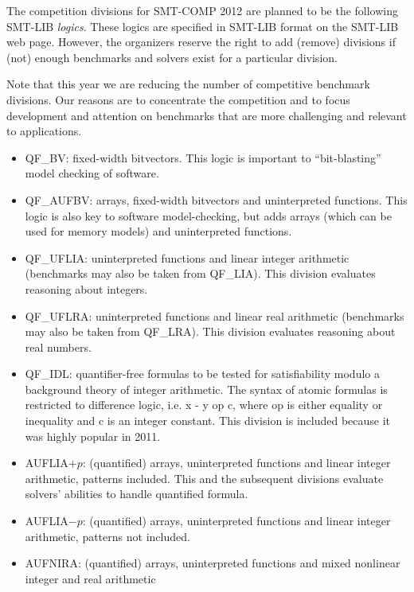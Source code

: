 \documentclass[12pt]{article}
\begin{document}
The competition divisions for SMT-COMP 2012 are planned to be the following
SMT-LIB \emph{logics}.  These logics are specified in SMT-LIB format on the
SMT-LIB web page.  However, the organizers reserve the right to add
(remove) divisions if (not) enough benchmarks and solvers exist for a
particular division.

Note that this year we are reducing the number of competitive benchmark divisions.
Our reasons are to concentrate the competition and to focus development and attention
on benchmarks that are more challenging and relevant to applications.

\begin{itemize}

\item QF\_BV: fixed-width bitvectors. This logic is important to ``bit-blasting'' model checking of software.
\item QF\_AUFBV: arrays, fixed-width bitvectors and uninterpreted
functions. This logic is also key to software model-checking, but adds arrays (which can be used for memory models) and uninterpreted functions.

\item QF\_UFLIA: uninterpreted functions and linear integer arithmetic (benchmarks may also be taken from  QF\_LIA). This division evaluates reasoning about integers.
\item QF\_UFLRA: uninterpreted functions and linear real arithmetic (benchmarks may also be taken from  QF\_LRA). This division evaluates reasoning about real numbers.

\item QF\_IDL: quantifier-free formulas to be
  tested for satisfiability modulo a background theory of integer
  arithmetic.  The syntax of atomic formulas is restricted to
  difference logic, i.e. x - y op c, where op is either equality or
  inequality and c is an integer constant. This division is included because it was highly popular in 2011.

\item AUFLIA$+p$: (quantified) arrays, uninterpreted functions and 
linear integer arithmetic, patterns included. This and the subsequent divisions evaluate solvers' abilities to handle quantified formula.
\item AUFLIA$-p$: (quantified) arrays, uninterpreted functions and 
linear integer arithmetic, patterns not included.
\item AUFNIRA: (quantified) arrays, uninterpreted functions and 
mixed nonlinear integer and real arithmetic

\end{itemize}
\end{document}
